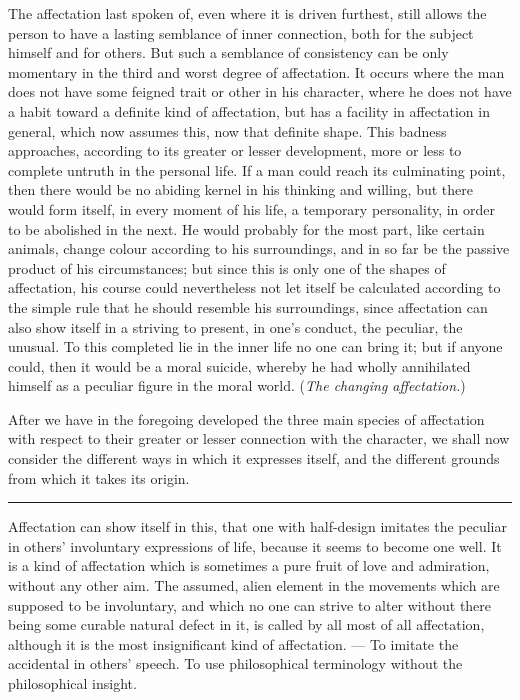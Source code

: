 \documentclass[12pt]{article}
\newcommand{\opage}[1]{\marginnote{\footnotesize\textit{[#1]}}}
\newcommand{\ombreak}{\par\medskip\begin{center}\rule{0.32\textwidth}{0.4pt}\end{center}\medskip}
\begin{document}
The affectation last spoken of, even where it is driven furthest, still allows the person to have a lasting semblance of inner connection, both for the subject himself and for others. But such a semblance of consistency can be only momentary in the third and worst degree of affectation. It occurs where the man does not have some feigned trait or other in his character, where he does not have a habit toward a definite kind of affectation, but has a facility in affectation in general, which now assumes this, now that definite shape. This badness approaches, according to its greater or lesser development, more or less to complete untruth in the personal life. If a man could reach its culminating point, then there would be no abiding kernel in his thinking and willing, but there would form itself, in every moment of his life, a temporary personality, in order to be abolished in the next. He would probably for the most part, like certain animals, change colour according to his surroundings, and in so far be the passive product of his circumstances; but since this is only one of the shapes of affectation, his course could nevertheless not let itself be calculated according to the simple rule that he should resemble his surroundings, since affectation can also show itself in a striving to present, in one's conduct, the peculiar, the unusual. To this completed lie in the inner life no one can bring it; but if anyone could, then it would be a moral suicide, whereby he had wholly annihilated himself as a peculiar figure in the moral world. (\emph{The changing affectation.})

After we have in the foregoing developed the three main species of affectation with respect to their greater or lesser connec\opage{173}tion with the character, we shall now consider the different ways in which it expresses itself, and the different grounds from which it takes its origin.

\ombreak

Affectation can show itself in this, that one with half-design imitates the peculiar in others' involuntary expressions of life, because it seems to become one well. It is a kind of affectation which is sometimes a pure fruit of love and admiration, without any other aim. The assumed, alien element in the movements which are supposed to be involuntary, and which no one can strive to alter without there being some curable natural defect in it, is called by all most of all affectation, although it is the most insignificant kind of affectation. --- To imitate the accidental in others' speech. To use philosophical terminology without the philosophical insight.
\end{document}
